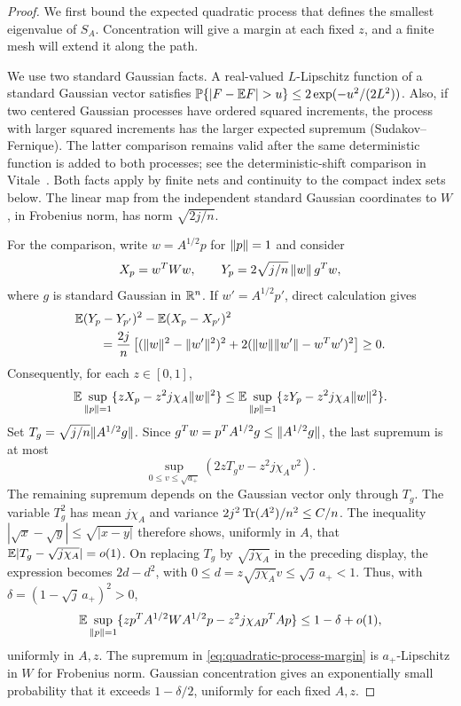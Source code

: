 \begin{proof}
We first bound the expected quadratic process that defines the
smallest eigenvalue of $S_A$.  Concentration will give a margin at
each fixed $z$, and a finite mesh will extend it along the path.

We use two standard Gaussian facts.  A real-valued
$L$-Lipschitz function of a standard Gaussian vector satisfies
$\Prob\{|F-\E F|>u\}\le2\exp(-u^2/(2L^2))$.
Also, if two centered Gaussian processes have ordered squared
increments, the process with larger squared increments has the
larger expected supremum (Sudakov--Fernique). The latter comparison remains valid
after the same deterministic function is added to both processes;
see the deterministic-shift comparison in Vitale~\cite{Vitale2000}.
Both facts apply by finite nets and continuity to the compact
index sets below.  The linear map from the independent standard
Gaussian coordinates to $W$, in Frobenius norm, has norm
$\sqrt{2j/n}$.

For the comparison, write $w=A^{1/2}p$ for $\lVert p\rVert=1$ and consider
\[
 X_p=w^TWw,\qquad
 Y_p=2\sqrt{j/n}\,\lVert w\rVert\,g^Tw,
\]
where $g$ is standard Gaussian in $\mathbb R^n$.  If $w'=A^{1/2}p'$, direct
calculation gives
\begin{align*}
 &\mathbb E(Y_p-Y_{p'})^2-\mathbb E(X_p-X_{p'})^2\\
 &\qquad=\frac{2j}{n}
 \left[(\lVert w\rVert^2-\lVert w'\rVert^2)^2
       +2(\lVert w\rVert\lVert w'\rVert-w^Tw')^2\right]\ge0.
\end{align*}
Consequently, for each $z\in[0,1]$,
\[
 \mathbb E\sup_{\lVert p\rVert=1}\{zX_p-z^2j\chi_A\lVert w\rVert^2\}
 \le \mathbb E\sup_{\lVert p\rVert=1}\{zY_p-z^2j\chi_A\lVert w\rVert^2\}.
\]
Set $T_g=\sqrt{j/n}\lVert A^{1/2}g\rVert$.  Since
$g^Tw=p^TA^{1/2}g\le\lVert A^{1/2}g\rVert$, the last supremum is at most
\[
 \sup_{0\le v\le\sqrt{a_+}}
       (2zT_gv-z^2j\chi_Av^2).
\]
The remaining supremum depends on the Gaussian vector only through
$T_g$.  The variable $T_g^2$ has mean $j\chi_A$ and variance
$2j^2\operatorname{Tr}(A^2)/n^2\le C/n$.  The inequality
$|\sqrt x-\sqrt y|\le\sqrt{|x-y|}$ therefore shows, uniformly in
$A$, that $\mathbb E|T_g-\sqrt{j\chi_A}|=o(1)$.  On replacing $T_g$ by
$\sqrt{j\chi_A}$ in the preceding display, the expression becomes
$2d-d^2$, with
$0\le d=z\sqrt{j\chi_A}v\le\sqrt j\,a_+<1$.
Thus, with $\delta=(1-\sqrt j\,a_+)^2>0$,
\begin{equation}\label{eq:quadratic-process-margin}
 \mathbb E\sup_{\lVert p\rVert=1}
 \{zp^TA^{1/2}WA^{1/2}p-z^2j\chi_Ap^TAp\}
 \le1-\delta+o(1),
\end{equation}
uniformly in $A,z$.
The supremum in \eqref{eq:quadratic-process-margin} is
$a_+$-Lipschitz in $W$ for Frobenius norm.  Gaussian concentration
gives an exponentially small probability that it exceeds
$1-\delta/2$, uniformly for each fixed $A,z$.


\end{proof}
